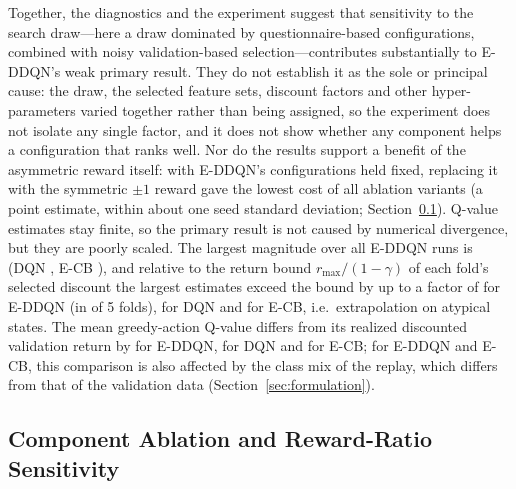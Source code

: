 Together, the diagnostics and the experiment suggest that sensitivity to the search draw---here a draw dominated by questionnaire-based configurations, combined with noisy validation-based selection---contributes substantially to E-DDQN's weak primary result. They do not establish it as the sole or principal cause: the draw, the selected feature sets, discount factors and other hyper-parameters varied together rather than being assigned, so the experiment does not isolate any single factor, and it does not show whether any component helps a configuration that ranks well. Nor do the results support a benefit of the asymmetric reward itself: with E-DDQN's configurations held fixed, replacing it with the symmetric $\pm1$ reward gave the lowest cost of all ablation variants (a point estimate, within about one seed standard deviation; Section~\ref{sec:ablation}). Q-value estimates stay finite, so the primary result is not caused by numerical divergence, but they are poorly scaled. The largest magnitude over all E-DDQN runs is \EDDQNQAbsMax{} (DQN \DQNQAbsMax, E-CB \ECBQAbsMax), and relative to the return bound $r_{\max}/(1-\gamma)$ of each fold's selected discount the largest estimates exceed the bound by up to a factor of \PHQRatioMaxEDDQN{} for E-DDQN (in \PHQRatioFoldsEDDQN{} of 5 folds), \PHQRatioMaxDQN{} for DQN and \PHQRatioMaxECB{} for E-CB, i.e.\ extrapolation on atypical states. The mean greedy-action Q-value differs from its realized discounted validation return by \EDDQNOverest{} for E-DDQN, \DQNOverest{} for DQN and \ECBOverest{} for E-CB; for E-DDQN and E-CB, this comparison is also affected by the class mix of the replay, which differs from that of the validation data (Section~\ref{sec:formulation}).

\begin{table}[t]
\centering
\caption{Selection optimism: pooled inner-validation 5:1 cost of the selected configuration (HPO seed, at its cost-minimizing threshold) versus its outer-test cost (seed ensemble, rule D1). Both are averaged over the five outer folds; the outer-test values are therefore unweighted fold means and differ from the pooled costs in Table~\ref{tab:main}.}
\label{tab:optimism}
\footnotesize

\end{table}

\subsection{Component Ablation and Reward-Ratio Sensitivity}
\label{sec:ablation}


